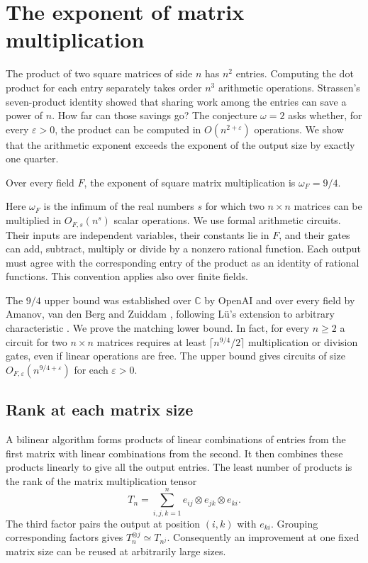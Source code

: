 \section{The exponent of matrix multiplication}\label{sec:intro}

The product of two square matrices of side \(n\) has \(n^2\) entries.
Computing the dot product for each entry separately takes order \(n^3\)
arithmetic operations. Strassen's seven-product identity showed that
sharing work among the entries can save a power of \(n\). How far can
those savings go? The conjecture \(\omega=2\) asks whether, for every
\(\varepsilon>0\), the product can be computed in \(O(n^{2+\varepsilon})\)
operations. We show that the arithmetic exponent exceeds the exponent of the output
size by exactly one quarter.

\begin{theorem}\label{thm:square}
Over every field \(F\), the exponent of square matrix multiplication is
\(\omega_F=9/4\).
\end{theorem}

Here \(\omega_F\) is the infimum of the real numbers \(s\) for which two \(n\times n\)
matrices can be multiplied in \(O_{F,s}(n^s)\) scalar operations. We use
formal arithmetic circuits. Their inputs are independent variables,
their constants lie in \(F\), and their gates can add, subtract,
multiply or divide by a nonzero rational function. Each output must
agree with the corresponding entry of the product as an identity of
rational functions. This convention applies also over finite fields.

The \(9/4\) upper bound was established over \(\mathbb C\) by OpenAI
\cite{nine} and over every field by Amanov, van den Berg and Zuiddam
\cite{abvz}, following L\"u's extension to arbitrary characteristic
\cite{lu}. We prove the matching lower bound. In fact, for every
\(n\ge2\) a circuit for two \(n\times n\) matrices requires at least
\(\lceil n^{9/4}/2\rceil\) multiplication or division gates, even if
linear operations are free. The upper bound gives circuits of size
\(O_{F,\varepsilon}(n^{9/4+\varepsilon})\) for each \(\varepsilon>0\).

\par{}
\subsection{Rank at each matrix size}

A bilinear algorithm forms products of linear combinations of entries
from the first matrix with linear combinations from the second. It
then combines these products linearly to give all the output entries.
The least number of products is the rank of the matrix multiplication
tensor
\[
             T_n=\sum_{i,j,k=1}^{n}
                    e_{ij}\otimes e_{jk}\otimes e_{ki}.
\]
The third factor pairs the output at position \((i,k)\) with \(e_{ki}\).
Grouping corresponding factors gives \(T_n^{\otimes j}\simeq T_{n^j}\).
Consequently an improvement at one fixed matrix size can be reused at
arbitrarily large sizes.

